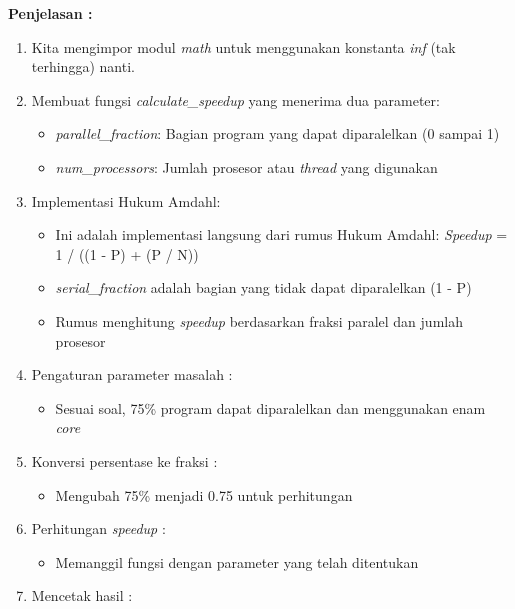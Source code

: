 \documentclass[12pt]{article}
\begin{document}
\begin{enumerate}
    \textbf{Penjelasan : }
    \begin{enumerate}
        \item Kita mengimpor modul \textit{math} untuk menggunakan konstanta \textit{inf} (tak terhingga) nanti.
        \item Membuat fungsi \textit{calculate\_speedup} yang menerima dua parameter:
            \begin{itemize}
                \item \textit{parallel\_fraction}: Bagian program yang dapat diparalelkan (0 sampai 1)
                \item \textit{num\_processors}: Jumlah prosesor atau \textit{thread} yang digunakan
            \end{itemize}
        \item Implementasi Hukum Amdahl:
            \begin{itemize}
                \item Ini adalah implementasi langsung dari rumus Hukum Amdahl: \textit{Speedup} = 1 / ((1 - P) + (P / N))
                \item \textit{serial\_fraction} adalah bagian yang tidak dapat diparalelkan (1 - P)
                \item Rumus menghitung \textit{speedup} berdasarkan fraksi paralel dan jumlah prosesor
            \end{itemize}
        \item Pengaturan parameter masalah :
            \begin{itemize}
                \item Sesuai soal, 75\% program dapat diparalelkan dan menggunakan enam \textit{core}
            \end{itemize}
        \item Konversi persentase ke fraksi :
            \begin{itemize}
                \item Mengubah 75\% menjadi 0.75 untuk perhitungan
            \end{itemize}
        \item Perhitungan \textit{speedup} :
            \begin{itemize}
                \item Memanggil fungsi dengan parameter yang telah ditentukan
            \end{itemize}
        \item  Mencetak hasil :
            \begin{itemize}

\end{itemize}
\end{enumerate}
\end{enumerate}
\end{document}
